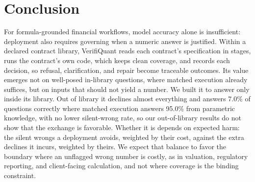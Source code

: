 \documentclass[sigconf]{acmart}
\newcommand{\oodVQcorrOOD}{7.0\%}   %
\newcommand{\oodRPALcorrOOD}{95.0\%}
\begin{document}
\section{Conclusion}
For formula-grounded financial workflows, model accuracy alone is insufficient: deployment also requires governing when a numeric answer is justified. Within a declared contract library, VerifiQuant reads each contract's specification in stages, runs the contract's own code, which keeps clean coverage, and records each decision, so refusal, clarification, and repair become traceable outcomes. Its value emerges not on well-posed in-library questions, where matched execution already suffices, but on inputs that should not yield a number. We built it to answer only inside its library. Out of library it declines almost everything and answers \oodVQcorrOOD{} of questions correctly where matched execution answers \oodRPALcorrOOD{} from parametric knowledge, with no lower silent-wrong rate, so our out-of-library results do not show that the exchange is favorable. Whether it is depends on expected harm: the silent wrongs a deployment avoids, weighted by their cost, against the extra declines it incurs, weighted by theirs. We expect that balance to favor the boundary where an unflagged wrong number is costly, as in valuation, regulatory reporting, and client-facing calculation, and not where coverage is the binding constraint.
\end{document}
